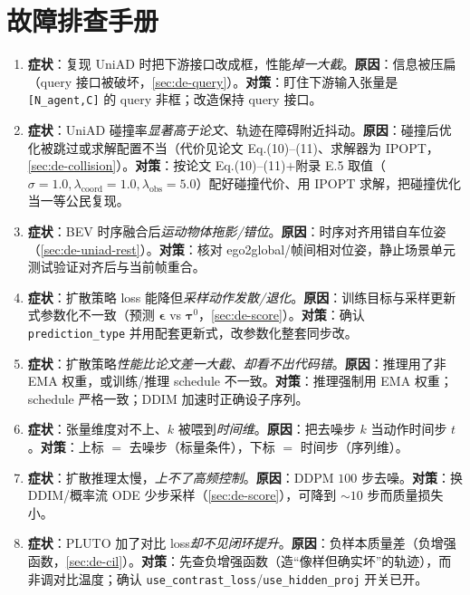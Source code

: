 \section*{故障排查手册}
\begin{enumerate}
  \item \textbf{症状}：复现 UniAD 时把下游接口改成框，性能\emph{掉一大截}。\textbf{原因}：信息被压扁（query 接口被破坏，\cref{sec:de-query}）。\textbf{对策}：盯住下游输入张量是 \texttt{[N\_agent,C]} 的 query 非框；改造保持 query 接口。
  \item \textbf{症状}：UniAD 碰撞率\emph{显著高于论文}、轨迹在障碍附近抖动。\textbf{原因}：碰撞后优化被跳过或求解配置不当（代价见论文 Eq.(10)--(11)、求解器为 IPOPT，\cref{sec:de-collision}）。\textbf{对策}：按论文 Eq.(10)--(11)$+$附录 E.5 取值（$\sigma=1.0,\lambda_{\text{coord}}=1.0,\lambda_{\text{obs}}=5.0$）配好碰撞代价、用 IPOPT 求解，把碰撞优化当一等公民复现。
  \item \textbf{症状}：BEV 时序融合后\emph{运动物体拖影/错位}。\textbf{原因}：时序对齐用错自车位姿（\cref{sec:de-uniad-rest}）。\textbf{对策}：核对 ego2global/帧间相对位姿，静止场景单元测试验证对齐后与当前帧重合。
  \item \textbf{症状}：扩散策略 loss 能降但\emph{采样动作发散/退化}。\textbf{原因}：训练目标与采样更新式参数化不一致（预测 $\boldsymbol{\epsilon}$ vs $\boldsymbol{\tau}^0$，\cref{sec:de-score}）。\textbf{对策}：确认 \texttt{prediction\_type} 并用配套更新式，改参数化整套同步改。
  \item \textbf{症状}：扩散策略\emph{性能比论文差一大截、却看不出代码错}。\textbf{原因}：推理用了非 EMA 权重，或训练/推理 schedule 不一致。\textbf{对策}：推理强制用 EMA 权重；schedule 严格一致；DDIM 加速时正确设子序列。
  \item \textbf{症状}：张量维度对不上、$k$ 被喂到\emph{时间维}。\textbf{原因}：把去噪步 $k$ 当动作时间步 $t$。\textbf{对策}：上标 $=$ 去噪步（标量条件），下标 $=$ 时间步（序列维）。
  \item \textbf{症状}：扩散推理太慢，\emph{上不了高频控制}。\textbf{原因}：DDPM $100$ 步去噪。\textbf{对策}：换 DDIM/概率流 ODE 少步采样（\cref{sec:de-score}），可降到 $\sim 10$ 步而质量损失小。
  \item \textbf{症状}：PLUTO 加了对比 loss\emph{却不见闭环提升}。\textbf{原因}：负样本质量差（负增强函数，\cref{sec:de-cil}）。\textbf{对策}：先查负增强函数（造“像样但确实坏”的轨迹），而非调对比温度；确认 \texttt{use\_contrast\_loss}/\allowbreak\texttt{use\_hidden\_proj} 开关已开。

\end{enumerate}
